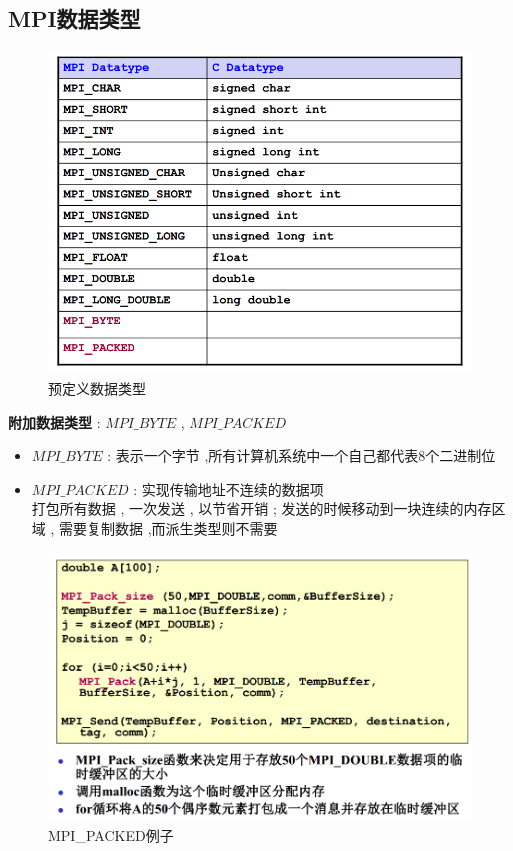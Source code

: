 \documentclass[UTF8,a4paper]{ctexart}
\begin{document}
\subsection{MPI数据类型}
\begin{figure}[H]
  \centering
  \includegraphics[scale = 0.3]{assets/ParallelComputing_76b4a.png}
  \caption{预定义数据类型}
\end{figure}

\textbf{附加数据类型} : $MPI\_BYTE$ , $MPI\_PACKED$
\begin{itemize}
  \item $MPI\_BYTE$ : 表示一个字节 ,所有计算机系统中一个自己都代表8个二进制位
  \item $MPI\_PACKED$ : 实现传输地址不连续的数据项 \\
  打包所有数据 , 一次发送 , 以节省开销 ; 发送的时候移动到一块连续的内存区域 , 需要复制数据 ,而派生类型则不需要
\end{itemize}
\begin{figure}[H]
  \centering
  \includegraphics[scale = 0.3]{assets/ParallelComputing_7fd1b.png}
  \caption{MPI\_PACKED例子}
\end{figure}
\end{document}
